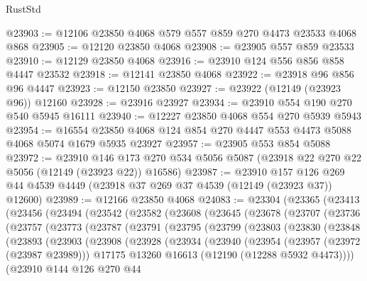 \begin{lexlean}{RustStd}
\begin{coremodule}
@23903 := @12106 @23850 @4068 @579 @557 @859 @270 @4473 @23533 @4068 @868
@23905 := @12120 @23850 @4068
@23908 := @23905 @557 @859 @23533
@23910 := @12129 @23850 @4068
@23916 := @23910 @124 @556 @856 @858 @4447 @23532
@23918 := @12141 @23850 @4068
@23922 := @23918 @96 @856 @96 @4447
@23923 := @12150 @23850
@23927 := @23922 (@12149 (@23923 @96)) @12160
@23928 := @23916 @23927
@23934 := @23910 @554 @190 @270 @540 @5945 @16111
@23940 := @12227 @23850 @4068 @554 @270 @5939 @5943
@23954 := @16554 @23850 @4068 @124 @854 @270 @4447 @553 @4473 @5088 @4068 @5074 @1679 @5935 @23927
@23957 := @23905 @553 @854 @5088
@23972 := @23910
    @146
    @173
    @270
    @534
    @5056
    @5087
    (@23918 @22 @270 @22 @5056 (@12149 (@23923 @22)) @16586)
@23987 := @23910
    @157
    @126
    @269
    @44
    @4539
    @4449
    (@23918 @37 @269 @37 @4539 (@12149 (@23923 @37)) @12600)
@23989 := @12166 @23850 @4068
@24083 := @23304
    (@23365
      (@23413
        (@23456
          (@23494
            (@23542
              (@23582
                (@23608
                  (@23645
                    (@23678
                      (@23707
                        (@23736
                          (@23757
                            (@23773
                              (@23787
                                (@23791
                                  (@23795
                                    (@23799
                                      (@23803
                                        (@23830
                                          (@23848
                                            (@23893
                                              (@23903
                                                (@23908
                                                  (@23928
                                                    (@23934
                                                      (@23940
                                                        (@23954
                                                          (@23957 (@23972 (@23987 @23989)))
                                                          @17175
                                                          @13260
                                                          @16613
                                                          (@12190 (@12288 @5932 @4473))))
                                                      (@23910
                                                        @144
                                                        @126
                                                        @270
                                                        @44

\end{coremodule}
\end{lexlean}
